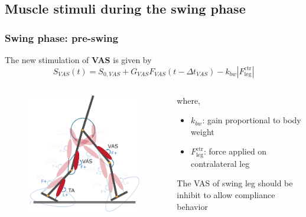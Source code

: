 \documentclass[10pt]{beamer}
\begin{document}
\subsection[Methodology]{Muscle stimuli during the swing phase}
\begin{frame}
	\frametitle{Swing phase: pre-swing}
	\begin{block}{}
		The new stimulation of \textbf{VAS} is given by
		\begin{equation*}
			S_{VAS}(t)=S_{0,VAS} + G_{VAS} F_{VAS} (t-\Delta t_{VAS}) - k_{bw}|F_{\textrm{leg}}^{\textrm{ctr}}|
		\end{equation*}
	\end{block}
	
	\begin{columns}
		\begin{column}{.5\textwidth}
			\begin{figure}
				\centering
				\includegraphics[width=.5\textheight]{images/new_model/swing/muscle_pre_vas.pdf}
			\end{figure}
		\end{column}
		\begin{column}{.5\textwidth}
			where,
			\begin{itemize}
				\item $k_{bw}$: gain proportional to body weight
				\item $F_{\textrm{leg}}^{\textrm{ctr}}$: force applied on contralateral leg
			\end{itemize}
			\begin{exampleblock}{}
				The VAS of swing leg should be inhibit to allow compliance behavior 
			\end{exampleblock}
		\end{column}
	\end{columns}	
\end{frame}
\end{document}
